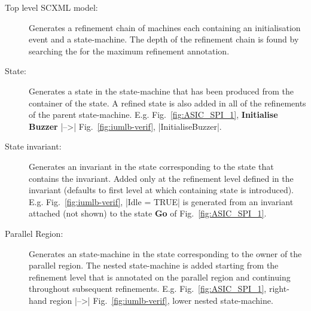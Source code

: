 \begin{description}
\item[Top level SCXML model:] 
  \begin{sloppypar}
    Generates a refinement chain of \EVENTB machines each containing
    an initialisation event and a \UMLB state-machine.  The depth of
    the refinement chain is found by searching the \SCXML for the
    maximum refinement annotation.
  \end{sloppypar}

\item[State:] Generates a state in the \UMLB state-machine that has been produced from the container of the \SCXML state. 
A refined state is also added in all of the refinements of the parent \UMLB state-machine. 
E.g. Fig.~\ref{fig:ASIC_SPI_1}, \textbf{Initialise Buzzer} |-->| Fig.~\ref{fig:iumlb-verif}, |InitialiseBuzzer|.

\item[State invariant:] Generates an invariant in the \UMLB state corresponding to the \SCXML state that contains the invariant. 
Added only at the refinement level defined in the invariant (defaults to first level at which containing \UMLB state is introduced). 
E.g. Fig.~\ref{fig:iumlb-verif}, |Idle = TRUE| is generated from an invariant attached (not shown) to the state \textbf{Go} of Fig.~\ref{fig:ASIC_SPI_1}.

\item[Parallel Region:] Generates an \UMLB state-machine in the state corresponding to the owner of the parallel region. 
The nested \UMLB state-machine is added starting from the refinement level that is annotated on the parallel region and continuing throughout subsequent refinements. 
E.g. Fig.~\ref{fig:ASIC_SPI_1}, right-hand region |-->| Fig.~\ref{fig:iumlb-verif}, lower nested state-machine.



\end{description}
